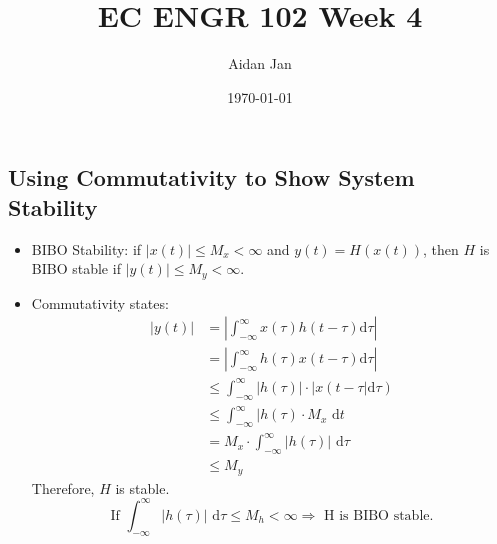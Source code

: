 \documentclass[10pt]{article}
\title{EC ENGR 102 Week 4}
\author{Aidan Jan}
\date{\today}
\begin{document}
\maketitle

\subsection*{Using Commutativity to Show System Stability}
\begin{itemize}
    \item BIBO Stability: if $|x(t)| \leq M_x < \infty$ and $y(t) = H(x(t))$, then $H$ is BIBO stable if $|y(t)| \leq M_y < \infty$.
    \item Commutativity states:
    \begin{align*}
        |y(t)| &= \left|\int_{-\infty}^\infty x(\tau) h(t - \tau) \text{d}\tau\right|\\
        &= \left|\int_{-\infty}^\infty h(\tau) x(t - \tau) \text{d}\tau \right|\\
        &\leq \int_{-\infty}^\infty |h(\tau)| \cdot |x(t - \tau| \text{d}\tau)\\
        &\leq \int_{-\infty}^\infty |h(\tau) \cdot M_x \text{ d}t\\
        &= M_x \cdot \int_{-\infty}^\infty |h(\tau)| \text{ d}\tau\\
        &\leq M_y
    \end{align*}
    Therefore, $H$ is stable.
    \[\text{If } \int_{-\infty}^\infty |h(\tau)| \text{ d}\tau \leq M_h < \infty \Rightarrow \text{ H is BIBO stable.}\]

    
\end{itemize}
\end{document}
